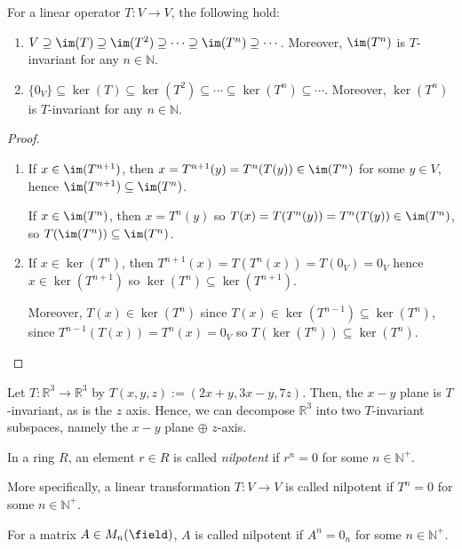 \begin{proposition}
    For a linear operator $T : V \to V$, the following hold:
    \begin{enumerate}
        \item $V \supseteq \im(T) \supseteq \im(T^2) \supseteq \cdots \supseteq \im(T^n) \supseteq  \cdots$. Moreover, $\im(T^n)$ is $T$-invariant for any $n \in \mathbb{N}$.
        \item $\{0_V\} \subseteq \ker(T) \subseteq \ker(T^2) \subseteq \cdots \subseteq \ker(T^n) \subseteq \cdots$. Moreover, $\ker(T^n)$ is $T$-invariant for any $n \in \mathbb{N}$.
    \end{enumerate}
\end{proposition}

\begin{proof}
    \begin{enumerate}
        \item If $x \in \im(T^{n+1})$, then $x = T^{n+1}(y) = T^{n}(T(y)) \in \im(T^n)$ for some $y \in V$, hence $\im(T^{n+1}) \subseteq \im(T^{n})$.
        
         If $x \in \im(T^n)$, then $x = T^{n}(y)$ so $T(x) = T(T^{n}(y)) = T^{n}(T(y)) \in \im (T^n)$, so $T(\im(T^n)) \subseteq \im(T^n)$.

         \item If $x \in \ker(T^n)$, then $T^{n+1}(x) = T(T^n(x)) = T(0_V) = 0_V$ hence $x \in \ker(T^{n+1})$ so $\ker(T^{n}) \subseteq \ker(T^{n+1})$.
         
         Moreover, $T(x) \in \ker(T^n)$ since $T(x) \in \ker (T^{n-1}) \subseteq \ker(T^n)$, since $T^{n-1}(T(x)) = T^{n}(x) = 0_V$ so $T(\ker(T^n)) \subseteq \ker(T^{n})$.
    \end{enumerate}
\end{proof}

\begin{example}
    Let $T: \mathbb{R}^3 \to \mathbb{R}^3$ by $T(x, y, z) := (2x +y, 3x - y, 7z)$. Then, the $x-y$ plane is $T$-invariant, as is the $z$ axis. Hence, we can decompose $\mathbb{R}^3$ into two $T$-invariant subspaces, namely the $x-y$ plane $\oplus$ $z$-axis.
\end{example}

\begin{definition}[Nilpotent]
    In a ring $R$, an element $r \in R$ is called \emph{nilpotent} if $r^n = 0$ for some $n \in \mathbb{N}^+$. 
    
    More specifically, a linear transformation $T: V \to V$ is called nilpotent if $T^n = 0$ for some $n \in \mathbb{N}^+$.

    For a matrix $A \in M_n(\field)$, $A$ is called nilpotent if $A^n = 0_n$ for some $n \in \mathbb{N}^+$.
\end{definition}

